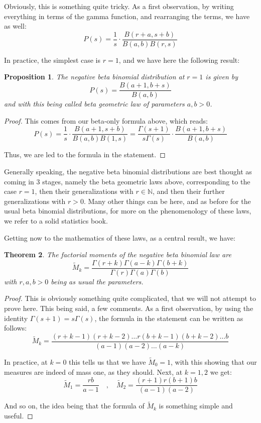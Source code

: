 \documentclass[12pt]{amsbook}
\newtheorem{theorem}{Theorem}[chapter]
\newtheorem{proposition}[theorem]{Proposition}
\begin{document}
Obviously, this is something quite tricky. As a first observation, by writing everything in terms of the gamma function, and rearranging the terms, we have as well:
$$P(s)=\frac{1}{s}\cdot\frac{B(r+a,s+b)}{B(a,b)B(r,s)}$$

In practice, the simplest case is $r=1$, and we have here the following result:

\begin{proposition}
The negative beta binomial distribution at $r=1$ is given by
$$P(s)=\frac{B(a+1,b+s)}{B(a,b)}$$
and with this being called beta geometric law of parameters $a,b>0$.
\end{proposition}

\begin{proof}
This comes from our beta-only formula above, which reads:
$$P(s)=\frac{1}{s}\cdot\frac{B(a+1,s+b)}{B(a,b)B(1,s)}=\frac{\Gamma(s+1)}{s\Gamma(s)}\cdot\frac{B(a+1,b+s)}{B(a,b)}$$

Thus, we are led to the formula in the statement.
\end{proof}

Generally speaking, the negative beta binomial distributions are best thought as coming in 3 stages, namely the beta geometric laws above, corresponding to the case $r=1$, then their generalizations with $r\in\mathbb N$, and then their further generalizations with $r>0$. Many other things can be here, and as before for the usual beta binomial distributions, for more on the phenomenology of these laws, we refer to a solid statistics book.

\bigskip

Getting now to the mathematics of these laws, as a central result, we have:

\begin{theorem}
The factorial moments of the negative beta binomial law are
$$\widetilde{M}_k=\frac{\Gamma(r+k)\Gamma(a-k)\Gamma(b+k)}{\Gamma(r)\Gamma(a)\Gamma(b)}$$
with $r,a,b>0$ being as usual the parameters.
\end{theorem}

\begin{proof}
This is obviously something quite complicated, that we will not attempt to prove here. This being said, a few comments. As a first observation, by using the identity $\Gamma(s+1)=s\Gamma(s)$, the formula in the statement can be written as follows:
$$\widetilde{M}_k=\frac{(r+k-1)(r+k-2)\ldots r(b+k-1)(b+k-2)\ldots b}{(a-1)(a-2)\ldots(a-k)}$$

In practice, at $k=0$ this tells us that we have $\widetilde{M}_0=1$, with this showing that our measures are indeed of mass one, as they should. Next, at $k=1,2$ we get:
$$\widetilde{M}_1=\frac{rb}{a-1}\quad,\quad \widetilde{M}_2=\frac{(r+1)r(b+1)b}{(a-1)(a-2)}$$

And so on, the idea being that the formula of $\widetilde{M}_k$ is something simple and useful.
\end{proof}
\end{document}
